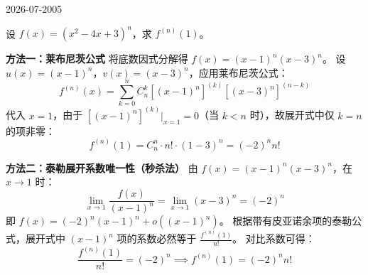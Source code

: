 \begin{mistake}{2026-07-20}{05}

\begin{problemcontent}
设 \( f(x) = (x^2 - 4x + 3)^n \)，求 \( f^{(n)}(1) \)。
\end{problemcontent}

\begin{solutioncontent}
\textbf{方法一：莱布尼茨公式}
将底数因式分解得 \( f(x) = (x-1)^n (x-3)^n \)。
设 \( u(x) = (x-1)^n \)，\( v(x) = (x-3)^n \)，应用莱布尼茨公式：
\[ f^{(n)}(x) = \sum_{k=0}^{n} C_n^k \left[ (x-1)^n \right]^{(k)} \left[ (x-3)^n \right]^{(n-k)} \]
代入 \( x=1 \)，由于 \( \left[ (x-1)^n \right]^{(k)} \big|_{x=1} = 0 \)（当 \( k < n \) 时），故展开式中仅 \( k=n \) 的项非零：
\[ f^{(n)}(1) = C_n^n \cdot n! \cdot (1-3)^n = (-2)^n n! \]

\textbf{方法二：泰勒展开系数唯一性（秒杀法）}
由 \( f(x) = (x-1)^n (x-3)^n \)，在 \( x \to 1 \) 时：
\[ \lim_{x \to 1} \frac{f(x)}{(x-1)^n} = \lim_{x \to 1} (x-3)^n = (-2)^n \]
即 \( f(x) = (-2)^n (x-1)^n + o\left((x-1)^n\right) \)。
根据带有皮亚诺余项的泰勒公式，展开式中 \( (x-1)^n \) 项的系数必然等于 \( \frac{f^{(n)}(1)}{n!} \)。
对比系数可得：
\[ \frac{f^{(n)}(1)}{n!} = (-2)^n \implies f^{(n)}(1) = (-2)^n n! \]
\end{solutioncontent}


\end{mistake}
